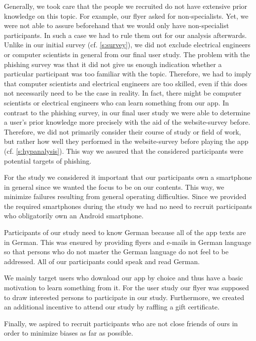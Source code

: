 \begin{description}[leftmargin=0cm]
	\item[Attackability:] Generally, we took care that the people we recruited do not have extensive prior knowledge on this topic.
For example, our flyer asked for non-specialists.
Yet, we were not able to assure beforehand that we would only have non-specialist participants.
In such a case we had to rule them out for our analysis afterwards.
Unlike in our initial survey (cf. \autoref{s:survey}), we did not exclude electrical engineers or computer scientists in general from our final user study.
The problem with the phishing survey was that it did not give us enough indication whether a particular participant was too familiar with the topic.
Therefore, we had to imply that computer scientists and electrical engineers are too skilled, even if this does not necessarily need to be the case in reality.
In fact, there might be computer scientists or electrical engineers who can learn something from our app.
In contrast to the phishing survey, in our final user study we were able to determine a user's prior knowledge more precisely with the aid of the website-survey before.
Therefore, we did not primarily consider their course of study or field of work, but rather how well they performed in the website-survey before playing the app (cf. \autoref{s:hypanalysis}).
This way we assured that the considered participants were potential targets of phishing.
	\item[Android Users:] For the study we considered it important that our participants own a smartphone in general since we wanted the focus to be on our contents. This way, we minimize failures resulting from general operating difficulties.
Since we provided the required smartphones during the study we had no need to recruit participants who obligatorily own an Android smartphone.
	\item[Language:] Participants of our study need to know German because all of the app texts are in German. This was ensured by providing flyers and e-mails in German language so that persons who do not master the German language do not feel to be addressed.
All of our participants could speak and read German.
\item[Motivation:] We mainly target users who download our app by choice and thus have a basic motivation to learn something from it.
For the user study our flyer was supposed to draw interested persons to participate in our study.
Furthermore, we created an additional incentive to attend our study by raffling a gift certificate.
\end{description}
Finally, we aspired to recruit participants who are not close friends of ours in order to minimize biases as far as possible.
